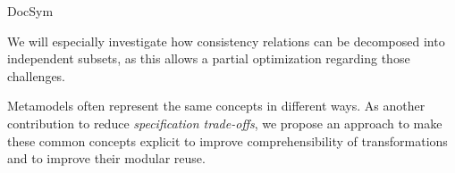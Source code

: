\begin{copiedFrom}{DocSym}
\begin{description}[leftmargin=\parindent]
        We will especially investigate how consistency relations can be decomposed into independent subsets, as this allows a partial optimization regarding those challenges.
    \item[Make common concepts explicit.] 
        Metamodels often represent the same concepts in different ways. As another contribution to reduce \emph{specification trade-offs}, we propose an approach to make these common concepts explicit to improve comprehensibility of transformations and to improve their modular reuse.
\end{description}




\end{copiedFrom}
